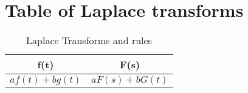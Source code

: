 \section{Table of Laplace transforms}
\begin{table}[h!]
    \centering
    \caption{Laplace Transforms and rules}
\begin{tabular}{|c | c|}
    \hline 
     f(t) & F(s) \\
    \hline 
     $a f(t) + b g(t)$ & $a F(s) + b G(t)$\\
     \hline 
\end{tabular}
    \label{tab:my_label}
\end{table}
